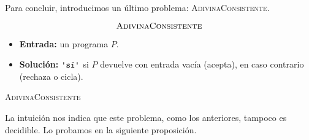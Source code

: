 Para concluir, introducimos un último problema: \textsc{AdivinaConsistente}. \cite{Aaronson2017}

\vspace{8pt}
\begin{problema}
\begin{framed}
$$\text{\textsc{AdivinaConsistente}}$$

\begin{itemize}
    \item \textbf{Entrada:} un programa $P$.
    \item \textbf{Solución:} $\palabra{sí}$ si $P$ devuelve  con entrada vacía (acepta),  en caso contrario (rechaza o cicla).
\end{itemize}
\end{framed}
\caption{\textsc{AdivinaConsistente}}
\label{prob:adivina-consistente}
\end{problema}

La intuición nos indica que este problema, como los anteriores, tampoco es decidible. Lo probamos en la siguiente proposición.

